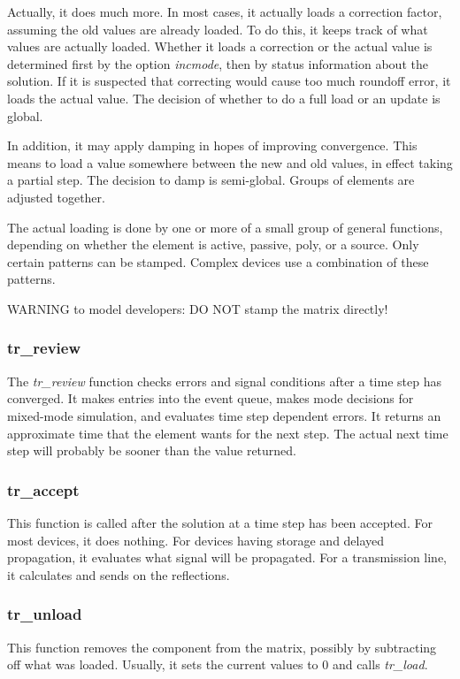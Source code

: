 Actually, it does much more.  In most cases, it actually loads a
correction factor, assuming the old values are already loaded.  To do
this, it keeps track of what values are actually loaded.  Whether it
loads a correction or the actual value is determined first by the
option {\em incmode}, then by status information about the solution.
If it is suspected that correcting would cause too much roundoff
error, it loads the actual value.  The decision of whether to do a
full load or an update is global.

In addition, it may apply damping in hopes of improving convergence.
This means to load a value somewhere between the new and old values,
in effect taking a partial step.  The decision to damp is semi-global.
Groups of elements are adjusted together.

The actual loading is done by one or more of a small group of general
functions, depending on whether the element is active, passive, poly,
or a source.  Only certain patterns can be stamped.  Complex devices
use a combination of these patterns.

WARNING to model developers:  DO NOT stamp the matrix directly!

\subsubsection{tr\_review}

The {\em tr\_review} function checks errors and signal conditions
after a time step has converged.  It makes entries into the event
queue, makes mode decisions for mixed-mode simulation, and evaluates
time step dependent errors.  It returns an approximate time that the
element wants for the next step.  The actual next time step will
probably be sooner than the value returned.

\subsubsection{tr\_accept}

This function is called after the solution at a time step has been
accepted.  For most devices, it does nothing.  For devices having
storage and delayed propagation, it evaluates what signal will be
propagated.  For a transmission line, it calculates and sends on the
reflections.

\subsubsection{tr\_unload}

This function removes the component from the matrix, possibly by
subtracting off what was loaded.  Usually, it sets the current values
to 0 and calls {\em tr\_load}.
